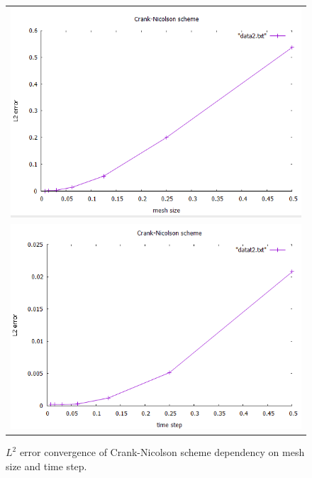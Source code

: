 \begin{figure}[h!]
	\centering
	\begin{tabular}{c}
		\includegraphics[width=.8\linewidth]{figures/CN} \\ \includegraphics[width=.8\linewidth]{figures/CNt}
	\end{tabular}
	\caption{$L^2$ error convergence of Crank-Nicolson scheme dependency on mesh size and time step.}
\end{figure}

